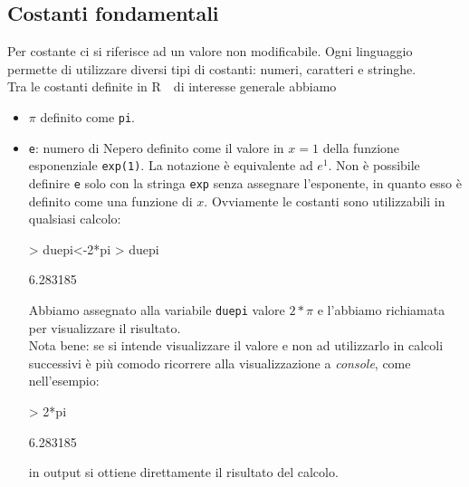 \documentclass[onecolumn,11pt]{book}
\newcommand{\rpr}{\textsf{R}~}
\begin{document}
\subsection{Costanti fondamentali}
Per costante ci si riferisce ad un valore non modificabile. Ogni linguaggio permette di utilizzare diversi tipi di costanti: numeri, caratteri e stringhe.\\  Tra le costanti definite in \rpr~di interesse generale abbiamo
\begin{itemize}
\item{}$\pi$ definito come \texttt{pi}.
\item{}\texttt{e}: numero di Nepero
definito come il  valore  in $x=1$ della funzione esponenziale \texttt{exp(1)}. La notazione \`e equivalente ad $e^1$.
Non \`e possibile definire \texttt{e} solo con la stringa \texttt{exp} senza assegnare l'esponente, in quanto esso \`e definito come una funzione di $x$.
Ovviamente le costanti sono utilizzabili in qualsiasi calcolo:
\begin{Schunk}
\begin{Sinput}
> duepi<-2*pi
> duepi
\end{Sinput}
\begin{Soutput}
[1] 6.283185
\end{Soutput}
\end{Schunk}
Abbiamo assegnato alla variabile \texttt{duepi}  valore $2*\pi$  e l'abbiamo richiamata per visualizzare il risultato.\\
Nota bene: se si intende visualizzare il valore e non ad utilizzarlo in calcoli successivi \`e pi\`u comodo ricorrere alla visualizzazione a \emph{console}, come nell'esempio:
\begin{Schunk}
\begin{Sinput}
> 2*pi
\end{Sinput}
\begin{Soutput}
[1] 6.283185
\end{Soutput}
\end{Schunk}
in output si ottiene direttamente il risultato del calcolo.
\end{itemize}
\end{document}
